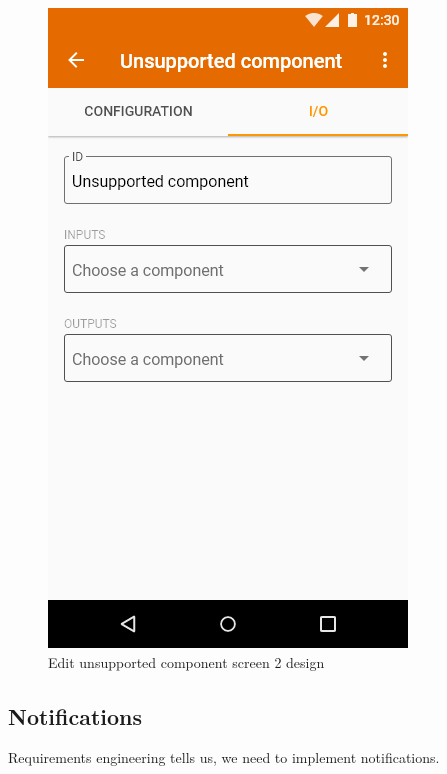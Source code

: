 \begin{figure}
\begin{minipage}[b]{0.32\textwidth}
    	\includegraphics[width=\textwidth]{pics/xd/Edit unsupported component - io.png}
    	\caption[Edit unsupported component screen 2]{Edit unsupported component screen 2 design}\label{fig:xdEditUnsupportedComponent2}
    \end{minipage}
\end{figure}

\subsection{Notifications}
Requirements engineering tells us, we need to implement notifications.

